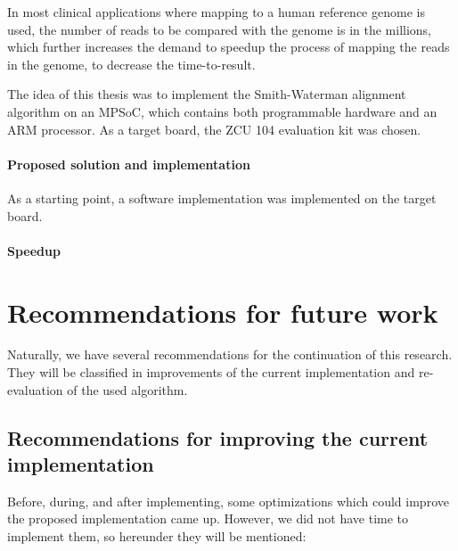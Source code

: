 In most clinical applications where mapping to a human reference genome is used, the number of reads to be compared with the genome is in the millions, which further increases the demand to speedup the process of mapping the reads in the genome, to decrease the time-to-result.

The idea of this thesis was to implement the Smith-Waterman alignment algorithm on an MPSoC, which contains both programmable hardware and an ARM processor. As a target board, the ZCU 104 evaluation kit was chosen.

\paragraph{Proposed solution and implementation}

As a starting point, a software implementation was implemented on the target board.

\paragraph{Speedup}



\section{Recommendations for future work}

Naturally, we have several recommendations for the continuation of this research. They will be classified in improvements of the current implementation and re-evaluation of the used algorithm.

\subsection{Recommendations for improving the current implementation}

Before, during, and after implementing, some optimizations which could improve the proposed implementation came up. However, we did not have time to implement them, so hereunder they will be mentioned:

